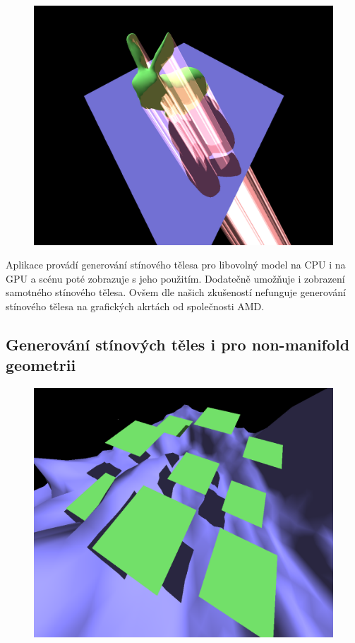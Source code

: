 \documentclass[11pt,a4paper]{article}
\begin{document}
\begin{figure}[h]
	\captionsetup{type=figure}
	\includegraphics[width=\textwidth]{images/bunny-volume.png}
\end{figure}

Aplikace provádí generování stínového tělesa pro libovolný model na CPU i na GPU a scénu poté zobrazuje s jeho použitím. Dodatečně umožňuje i zobrazení samotného stínového tělesa. Ovšem dle našich zkušeností nefunguje generování stínového tělesa na grafických akrtách od společnosti AMD.

\subsection{Generování stínových těles i pro non-manifold geometrii}

\begin{figure}[h]
	\captionsetup{type=figure}
	\includegraphics[width=\textwidth]{images/multiple-raised-planes.png}
	\label{fig:multiple-raised-planes}
\end{figure}
\end{document}
